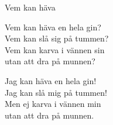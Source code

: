 \begin{song}{Vem kan häva}
	
	
	
	Vem kan häva en hela gin?\\
	Vem kan slå sig på tummen?\\
	Vem kan karva i vännen sin\\
	utan att dra på munnen?
	
	Jag kan häva en hela gin!\\
	Jag kan slå mig på tummen!\\
	Men ej karva i vännen min\\
	utan att dra på munnen.
	
\end{song}
